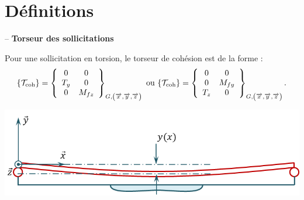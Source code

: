 \documentclass[10pt,fleqn]{article} %
\begin{document}

\vspace{2cm}
\pagestyle{fancy}
\thispagestyle{plain}

\section{Définitions}
\begin{defi} -- \textbf{Torseur des sollicitations}  ~\\

\begin{minipage}[c]{.65\linewidth}
Pour une sollicitation en torsion, le torseur de cohésion est de la forme : 
$$
\{\mathcal{T}_{\text{coh}}\} = \torseurcol{0}{T_y}{0}{0}{0}{M_{fz}}{G,\left(\vx{}, \vy{}, \vz{} \right)} 
\text{ ou } 
\{\mathcal{T}_{\text{coh}}\} = \torseurcol{0}{0}{T_z}{0}{M_{fy}}{0}{G,\left(\vx{}, \vy{}, \vz{} \right)} 
.$$
\end{minipage} \hfill
\begin{minipage}[c]{.3\linewidth}
\begin{center}
\includegraphics[width=\linewidth]{images/flexion}
\end{center}
\end{minipage}

\end{defi}
\end{document}
